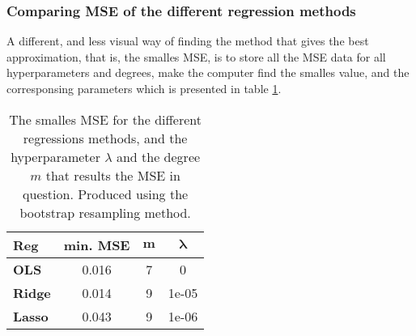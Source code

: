 \subsubsection{Comparing MSE of the different regression methods}
A different, and less visual way of finding the method that gives the best approximation, that is, the smalles MSE, is to store all the MSE data for all hyperparameters and degrees, make the computer find the smalles value, and the corresponsing parameters which is presented in table \ref{tab:minerrorFRANKE}.
\begin{table}[htbp]
\caption{The smalles MSE for the different regressions methods, and the hyperparameter $\lambda$ and the degree $m$ that results the MSE in question. Produced using the bootstrap resampling method.}
\centering
\begin{tabular}[width=0.5\textwidth]{lccc}
\hline
\textbf{Reg} & \textbf{min. MSE} & $\boldsymbol{m}$ & $\boldsymbol{\lambda}$ \\
\hline
\textbf{OLS} & 0.016 & 7 & 0 \\
\textbf{Ridge} & 0.014 & 9 & 1e-05 \\
\textbf{Lasso} & 0.043 & 9 & 1e-06
\end{tabular}
\label{tab:minerrorFRANKE}
\end{table}


\vfill
\newpage
